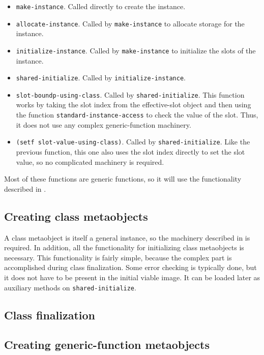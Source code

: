 \begin{itemize}
\item \texttt{make-instance}.  Called directly to create the instance.
\item \texttt{allocate-instance}.  Called by \texttt{make-instance} to
  allocate storage for the instance.
\item \texttt{initialize-instance}.  Called by \texttt{make-instance}
  to initialize the slots of the instance.
\item \texttt{shared-initialize}.  Called by
  \texttt{initialize-instance}.
\item \texttt{slot-boundp-using-class}.  Called by
  \texttt{shared-initialize}.  This function works by taking the slot
  index from the effective-slot object and then using the function
  \texttt{standard-instance-access} to check the value of the slot.
  Thus, it does not use any complex generic-function machinery.
\item \texttt{(setf slot-value-using-class)}.  Called by
  \texttt{shared-initialize}.  Like the previous function, this one
  also uses the slot index directly to set the slot value, so no
  complicated machinery is required.
\end{itemize}

Most of these functions are generic functions, so it will use the
functionality described in
.


\subsection{Creating class metaobjects}

A class metaobject is itself a general instance, so the machinery
described in  is
required.  In addition, all the functionality for initializing class
metaobjects is necessary.  This functionality is fairly simple,
because the complex part is accomplished during class finalization.
Some error checking is typically done, but it does not have to be
present in the initial viable image.  It can be loaded later as
auxiliary methods on \texttt{shared-initialize}.

\subsection{Class finalization}

\subsection{Creating generic-function metaobjects}

